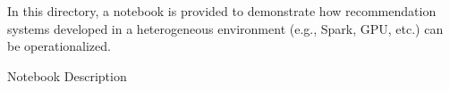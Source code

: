 In this directory, a notebook is provided to demonstrate how recommendation systems developed in a heterogeneous environment (e.g., Spark, GPU, etc.) can be operationalized.

Notebook	Description
